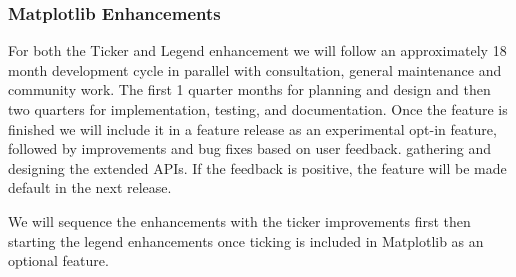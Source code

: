 \documentclass[12pt]{article}
\numberwithin{page}{section}
\begin{document}
\subsubsection{Matplotlib Enhancements}

For both the Ticker and Legend enhancement we will follow an approximately 18
month development cycle in parallel with consultation, general maintenance and
community work.  The first 1 quarter months for planning and design and then
two quarters for implementation, testing, and documentation.  Once the feature
is finished we will include it in a feature release as an experimental opt-in
feature, followed by improvements and bug fixes based on user feedback.
gathering and designing the extended APIs.  If the feedback is positive, the
feature will be made default in the next release.

We will sequence the enhancements with the ticker improvements first then
starting the legend enhancements once ticking is included in Matplotlib as an
optional feature.


\end{document}
